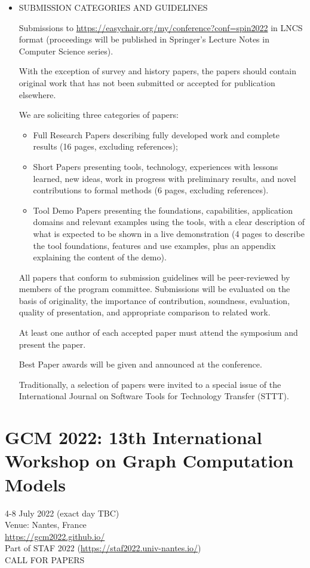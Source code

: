 \documentclass[prodmode,acmtecs]{acmsmall} %
\begin{document}
\begin{itemize}
\item  SUBMISSION CATEGORIES AND GUIDELINES 
 
  Submissions to \href{https://easychair.org/my/conference?conf=spin2022}{https://easychair.org/my/conference?conf=spin2022} in LNCS format (proceedings will be published in Springer’s Lecture Notes in Computer Science series). 
 
  With the exception of survey and history papers, the papers should contain original work that has not been submitted or accepted for publication elsewhere. 
 
  We are soliciting three categories of papers: 
 
\begin{itemize}\item  Full Research Papers describing fully developed work and complete results (16 pages, excluding references);
\item  Short Papers presenting tools, technology, experiences with lessons learned, new ideas, work in progress with preliminary results, and novel contributions to formal methods (6 pages, excluding references).
\item  Tool Demo Papers presenting the foundations, capabilities, application domains and relevant examples using the tools, with a clear description of what is expected to be shown in a live demonstration (4 pages to describe the tool foundations, features and use examples, plus an appendix explaining the content of the demo).
\end{itemize} 
  All papers that conform to submission guidelines will be peer-reviewed by members of the program committee. Submissions will be evaluated on the basis of originality, the importance of contribution, soundness, evaluation, quality of presentation, and appropriate comparison to related work. 
 
  At least one author of each accepted paper must attend the symposium and present the paper. 
 
  Best Paper awards will be given and announced at the conference. 
 
  Traditionally, a selection of papers were invited to a special issue of the International Journal on Software Tools for Technology Transfer (STTT).  
 
\end{itemize}\section{GCM 2022: 13th International Workshop on Graph Computation Models}\label{GCM2022}  4-8 July 2022 (exact day TBC)\\ 
  Venue: Nantes, France\\ 
  \href{https://gcm2022.github.io/}{https://gcm2022.github.io/}\\ 
  Part of STAF 2022 (\href{https://staf2022.univ-nantes.io/}{https://staf2022.univ-nantes.io/})\\ 
CALL FOR PAPERS 
\end{document}
